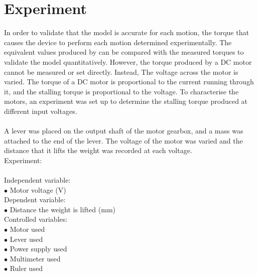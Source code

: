\chapter{Experiment}
In order to validate that the model is accurate for each motion, the torque that causes the device to perform each motion determined experimentally. The equivalent values produced by can be compared with the measured torques to validate the model quantitatively. However, the torque produced by a DC motor cannot be measured or set directly. Instead, The voltage across the motor is varied. The torque of a DC motor is proportional to the current running through it, and the stalling torque is proportional to the voltage. To characterise the motors, an experiment was set up to determine the stalling torque produced at different input voltages. \\
\\
A lever was placed on the output shaft of the motor gearbox, and a mass was attached to the end of the lever. The voltage of the motor was varied and the distance that it lifts the weight was recorded at each voltage.\\
Experiment:\\\\

Independent variable:\\
$\bullet$ Motor voltage (V)\\
Dependent variable:\\
$\bullet$ Distance the weight is lifted (mm)\\
Controlled variables:\\
$\bullet$ Motor used\\
$\bullet$ Lever used\\
$\bullet$ Power supply used\\
$\bullet$ Multimeter used\\
$\bullet$ Ruler used\\
